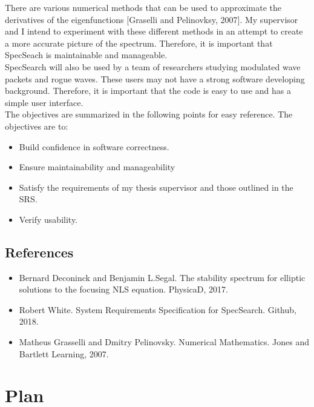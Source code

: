 \documentclass[12pt, titlepage]{article}
\begin{document}
	There are various numerical methods that can be used to approximate the 
	derivatives of the eigenfunctions [Graselli and Pelinovksy, 2007]. My 
	supervisor and I intend to experiment with these different 
	methods in an attempt to create a more accurate picture of the spectrum. 
	Therefore, it is important that SpecSeach is maintainable and 
	manageable. \\
	
	 SpecSearch will also be used by a team of researchers studying modulated 
	 wave packets and rogue waves. These users may not have a strong software 
	 developing background. Therefore, it is important that the code is easy to 
	 use and has a simple user interface. \\
	 
	 The objectives are summarized in the following points for easy reference. 
	 The objectives are to:
	
\begin{itemize}
	\item Build confidence in software correctness.
	\item Ensure maintainability and manageability 
	\item Satisfy the requirements of my thesis supervisor and those outlined 
	in the SRS. 
	\item Verify usability.	
\end{itemize}

\subsection{References}

\begin{itemize} 

	\item 	Bernard Deconinck and Benjamin L.Segal. 
	The stability spectrum for elliptic solutions to the focusing NLS equation. 
	PhysicaD, 2017.  
	\item Robert White. System Requirements Specification for SpecSearch. 
	Github, 2018.
	\item Matheus Grasselli and Dmitry Pelinovsky. Numerical Mathematics. Jones 
	and Bartlett Learning, 2007.
	
\end{itemize}

\section{Plan}
	
\end{document}
